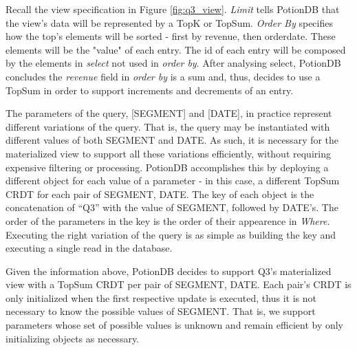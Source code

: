 \documentclass[sigplan,10pt]{acmart}
\begin{document}
Recall the view specification in Figure \ref{fig:q3_view}.
\emph{Limit} tells PotionDB that the view's data will be represented by a TopK or TopSum.
\emph{Order By} specifies how the top's elements will be sorted - first by revenue, then orderdate.
These elements will be the "value" of each entry.
The id of each entry will be composed by the elements in \emph{select} not used in \emph{order by}. %
After analysing select, PotionDB concludes the \emph{revenue} field in \emph{order by} is a sum and, thus, decides to use a TopSum in order to support increments and decrements of an entry.

The parameters of the query, [SEGMENT] and [DATE], in practice represent different variations of the query.
That is, the query may be instantiated with different values of both SEGMENT and DATE.
As such, it is necessary for the materialized view to support all these variations efficiently, without requiring expensive filtering or processing.
PotionDB accomplishes this by deploying a different object for each value of a parameter - in this case, a different TopSum CRDT for each pair of SEGMENT, DATE. 
The key of each object is the concatenation of “Q3” with the value of SEGMENT, followed by DATE’s. 
The order of the parameters in the key is the order of their appearence in \emph{Where}. 
Executing the right variation of the query is as simple as building the key and executing a single read in the database.
 
 
 Given the information above, PotionDB decides to support Q3’s materialized view with a TopSum CRDT per pair of SEGMENT, DATE.
 Each pair's CRDT is only initialized when the first respective update is executed, thus it is not necessary to know the possible values of SEGMENT.
 That is, we support parameters whose set of possible values is unknown and remain efficient by only initializing objects as necessary.
 
\end{document}
